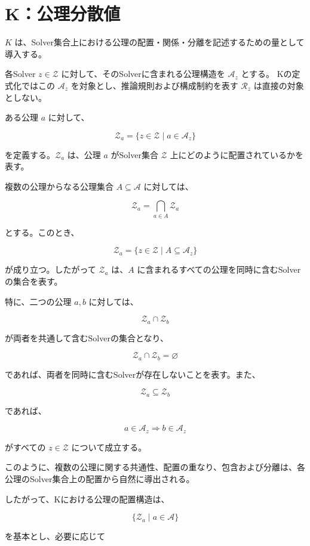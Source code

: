 \section{K：公理分散値}

$K$ は、Solver集合上における公理の配置・関係・分離を記述するための量として導入する。

各Solver $z\in\mathcal{Z}$ に対して、そのSolverに含まれる公理構造を $\mathcal{A}_z$ とする。
Kの定式化ではこの $\mathcal{A}_z$ を対象とし、推論規則および構成制約を表す $\mathcal{R}_z$ は直接の対象としない。

ある公理 $a$ に対して、

\[
\mathcal{Z}_a = \{z\in\mathcal{Z}\mid a\in\mathcal{A}_z\}
\]

を定義する。$\mathcal{Z}_a$ は、公理 $a$ がSolver集合 $\mathcal{Z}$ 上にどのように配置されているかを表す。

複数の公理からなる公理集合 $A\subseteq\mathcal{A}$ に対しては、

\[
\mathcal{Z}_a = \bigcap_{a\in A}\mathcal{Z}_a
\]

とする。このとき、

\[
\mathcal{Z}_a = \{z\in\mathcal{Z}\mid A\subseteq\mathcal{A}_z\}
\]

が成り立つ。したがって $\mathcal{Z}_a$ は、$A$ に含まれるすべての公理を同時に含むSolverの集合を表す。

特に、二つの公理 $a,b$ に対しては、

\[
\mathcal{Z}_a\cap\mathcal{Z}_b
\]

が両者を共通して含むSolverの集合となり、

\[
\mathcal{Z}_a\cap\mathcal{Z}_b=\varnothing
\]

であれば、両者を同時に含むSolverが存在しないことを表す。また、

\[
\mathcal{Z}_a\subseteq\mathcal{Z}_b
\]

であれば、

\[
a\in\mathcal{A}_z\Rightarrow b\in\mathcal{A}_z
\]

がすべての $z\in\mathcal{Z}$ について成立する。

このように、複数の公理に関する共通性、配置の重なり、包含および分離は、各公理のSolver集合上の配置から自然に導出される。

したがって、Kにおける公理の配置構造は、

\[
\{\mathcal{Z}_a\mid a\in\mathcal{A}\}
\]

を基本とし、必要に応じて

